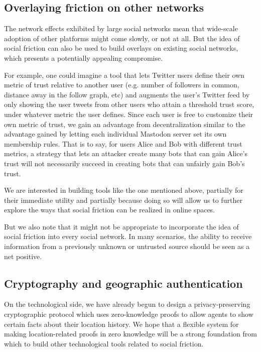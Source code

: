 \documentclass[sigconf,authordraft]{acmart}
\begin{document}
\subsection{Overlaying friction on other networks}

The network effects \cite{katz1994systems} exhibited by large social networks mean that wide-scale adoption of other platforms might come slowly, or not at all. But the idea of social friction can also be used to build overlays on existing social networks, which presents a potentially appealing compromise.  

For example, one could imagine a tool that lets Twitter users define their own metric of trust relative to another user (e.g. number of followers in common, distance away in the follow graph, etc) and augments the user's Twitter feed by only showing the user tweets from other users who attain a threshold trust score, under whatever metric the user defines. Since each user is free to customize their own metric of trust, we gain an advantage from decentralization similar to the advantage gained by letting each individual Mastodon server set its own membership rules. That is to say, for users Alice and Bob with different trust metrics, a strategy that lets an attacker create many bots that can gain Alice's trust will not necessarily succeed in creating bots that can unfairly gain Bob's trust. 

We are interested in building tools like the one mentioned above, partially for their immediate utility and partially because doing so will allow us to further explore the ways that social friction can be realized in online spaces.

But we also note that it might not be appropriate to incorporate the idea of social friction into every social network. In many scenarios, the ability to receive information from a previously unknown or untrusted source should be seen as a net positive. 


\subsection{Cryptography and geographic authentication}
On the technological side, we have already begun to design a privacy-preserving cryptographic protocol which uses zero-knowledge proofs \cite{goldreich1991proofs} to allow agents to show certain facts about their location history.  We hope that a flexible system for making location-related proofs in zero knowledge will be a strong foundation from which to build other technological tools related to social friction.
\end{document}
